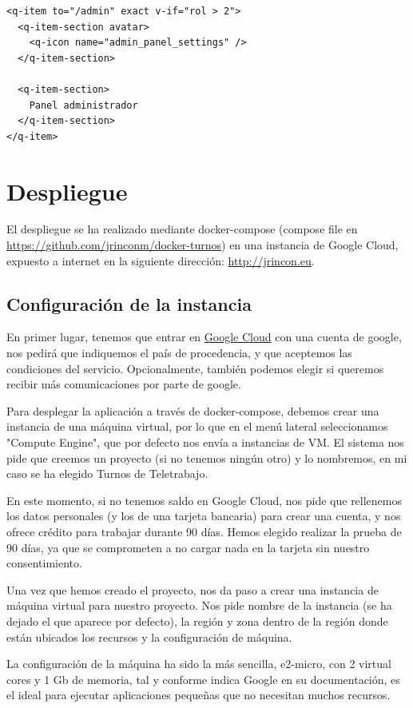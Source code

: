 \documentclass[11pt,spanish,listoffigures,listoftables]{tfgetsinf}
\begin{document}
\begin{lstlisting}[style=ES6, caption={Renderización condicional de punto de menú Admin}]
  <q-item to="/admin" exact v-if="rol > 2">
  <q-item-section avatar>
    <q-icon name="admin_panel_settings" />
  </q-item-section>

  <q-item-section>
    Panel administrador
  </q-item-section>
</q-item>
\end{lstlisting}
\chapter{Despliegue}

El despliegue se ha realizado mediante docker-compose (compose file en \url{https://github.com/jrinconm/docker-turnos}) en una instancia de Google Cloud, expuesto a internet en la siguiente dirección:
\url{http://jrincon.eu}.

\section{Configuración de la instancia}
En primer lugar, tenemos que entrar en \href{https://console.cloud.google.com/}{Google Cloud} con una cuenta de google, nos pedirá que indiquemos el país de procedencia, y que aceptemos las condiciones del servicio.
Opcionalmente, también podemos elegir si queremos recibir más comunicaciones por parte de google.

Para desplegar la aplicación a través de docker-compose, debemos crear una instancia de una máquina virtual, por lo que en el menú lateral seleccionamos "Compute Engine", que por defecto nos envía a instancias de VM.
El sistema nos pide que creemos un proyecto (si no tenemos ningún otro) y lo nombremos, en mi caso se ha elegido Turnos de Teletrabajo.

En este momento, si no tenemos saldo en Google Cloud, nos pide que rellenemos los datos personales (y los de una tarjeta bancaria) para crear una cuenta, y nos ofrece crédito para trabajar durante 90 días. 
Hemos elegido realizar la prueba de 90 días, ya que se comprometen a no cargar nada en la tarjeta sin nuestro consentimiento.

Una vez que hemos creado el proyecto, nos da paso a crear una instancia de máquina virtual para nuestro proyecto. 
Nos pide nombre de la instancia (se ha dejado el que aparece por defecto), la región y zona dentro de la región donde están ubicados los recursos y la configuración de máquina.

La configuración de la máquina ha sido la más sencilla, e2-micro, con 2 virtual cores y 1 Gb de memoria, tal y conforme indica Google en su documentación, es el ideal para ejecutar aplicaciones pequeñas que no necesitan muchos recursos.
\end{document}
